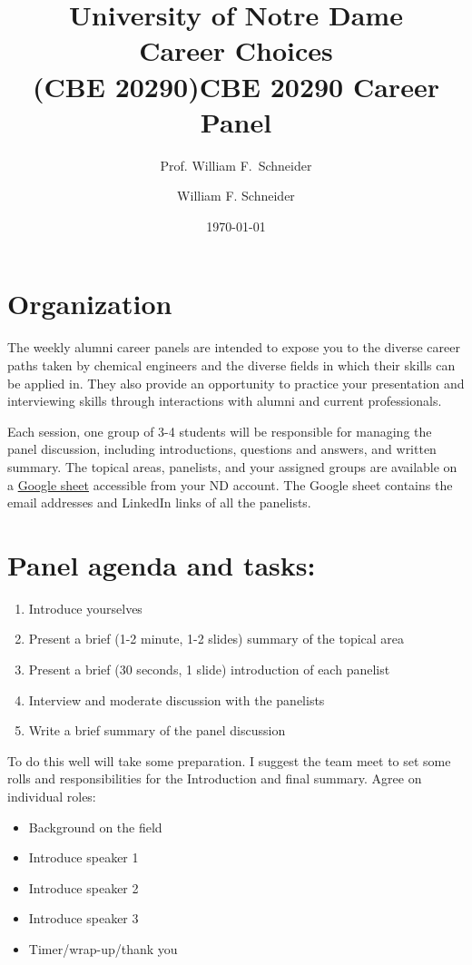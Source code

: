 \documentclass[11pt]{article}
\title{University of Notre Dame\\Career Choices\\(CBE 20290)}
\author{Prof. William F.\ Schneider}
\author{William F. Schneider}
\date{\today}
\title{CBE 20290 Career Panel}
\begin{document}
\begin{OPTIONS}
\end{OPTIONS}

\section{Organization}
\label{sec:orge3ee8ea}
The weekly alumni career panels are intended to expose you to the diverse career paths taken by chemical engineers and  the diverse fields in which their skills can be applied in. They also provide an opportunity to practice your presentation and interviewing skills through interactions with alumni and current professionals.

Each session, one group of 3-4 students will be responsible for managing the panel discussion, including introductions, questions and answers, and written summary. The topical areas, panelists, and your assigned groups  are available on a \href{https://docs.google.com/spreadsheets/d/1cjuvP2S-zgWGZjiKhLU1Qg3ROS5dn2VucOxKP6T6Hpw/edit?usp=sharing}{Google sheet}  accessible from your ND account.  The Google sheet contains the email addresses and LinkedIn links of all the panelists.

\section{Panel agenda and tasks:}
\label{sec:org657dcc3}
\begin{enumerate}
\item Introduce yourselves
\item Present a brief (1-2  minute, 1-2 slides) summary of the topical area
\item Present a brief (30 seconds, 1 slide) introduction of each panelist
\item Interview and moderate discussion with the panelists
\item Write a brief summary of the panel discussion
\end{enumerate}

To do this well will take some preparation. I suggest the team meet to set some rolls and responsibilities for the Introduction and final summary. Agree on individual roles:
\begin{itemize}
\item Background on the field
\item Introduce speaker 1
\item Introduce speaker 2
\item Introduce speaker 3
\item Timer/wrap-up/thank you
\end{itemize}
\end{document}
